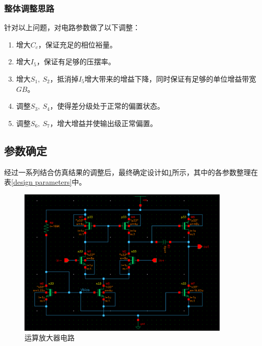 \documentclass[UTF8]{ctexart}
\numberwithin{figure}{subsection}
\numberwithin{table}{subsection}
\numberwithin{equation}{subsection}
\begin{document}
\subsubsection{整体调整思路}
针对以上问题，对电路参数做了以下调整：
\begin{enumerate}
    \item 增大\(C_c\)，保证充足的相位裕量。
    \item 增大\(I_5\)，保证有足够的压摆率。
    \item 增大\(S_1,\ S_2\)，抵消掉\(I_5\)增大带来的增益下降，同时保证有足够的单位增益带宽\(GB\)。
    \item 调整\(S_3,\ S_4\)，使得差分级处于正常的偏置状态。
    \item 调整\(S_6,\ S_7\)，增大增益并使输出级正常偏置。
\end{enumerate}


\subsection{参数确定}
经过一系列结合仿真结果的调整后，最终确定设计如\ref{design circuit}所示，其中的各参数整理在表\ref{design parameters}中。

\begin{figure}[!ht]
    \begin{center}
        \includegraphics[width=0.9\textwidth]{design circuit.png}
    \end{center}
    \caption{运算放大器电路}
    \label{design circuit}
\end{figure}
\end{document}
